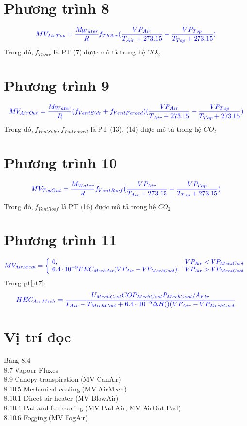 \documentclass[13pt,a4paper]{article}
\begin{document}
	\section{Phương trình 8}
		\begin{align}
			\color{blue}
				MV_{AirTop} = \frac{M_{Water}}{R}f_{ThScr}(\dfrac{VP_{Air}}{T_{Air} + 273.15} - \dfrac{VP_{Top}}{T_{Top} + 273.15})
			\color{blue}
			\label{pt8}
		\end{align}
		Trong đó, $f_{ThScr}$ là PT (7) được mô tả trong hệ $CO_2$
	\section{Phương trình 9}
		\begin{align}
			\color{blue}
				MV_{AirOut} = \frac{M_{Water}}{R}(f_{VentSide} + f_{VentForced})(\dfrac{VP_{Air}}{T_{Air} + 273.15} - \dfrac{VP_{Top}}{T_{Top} + 273.15})
			\color{blue}
			\label{pt9}
		\end{align}
		Trong đó, $f_{VentSide}, f_{VentForced}$ là PT (13), (14) được mô tả trong hệ $CO_2$
	\section{Phương trình 10}
		\begin{align}
			\color{blue}
				MV_{TopOut} = \frac{M_{Water}}{R}f_{VentRoof}(\dfrac{VP_{Air}}{T_{Air} + 273.15} - \dfrac{VP_{Top}}{T_{Top} + 273.15})
			\color{blue}
			\label{pt10}
		\end{align}
		Trong đó, $f_{VentRoof}$ là PT (16) được mô tả trong hệ $CO_2$
	\section{Phương trình 11}
		\begin{align}
			\color{blue}
			MV_{AirMech} = \left\{\begin{array}{llr}
				0,& VP_{Air} < VP_{MechCool} \\
				6.4\cdot 10^{-9} HEC_{MechAir}(VP_{Air} - VP_{MechCool}).& VP_{Air} > VP_{MechCool}
			\end{array}\right.
			\color{blue}
			\label{pt11}
		\end{align}
		Trong pt\ref{pt7}:
		\begin{align*}
			\color{blue}
				HEC_{AirMech} = \dfrac{U_{MechCool}COP_{MechCool}P_{MechCool}/A_{Flr}}{T_{Air} - T_{MechCool} +6.4\cdot 10^{-9}\Delta H ()(VP_{Air} - VP_{MechCool}}
			\color{blue}
		\end{align*}
	\section{Vị trí đọc}
	Bảng 8.4 \\
	8.7 Vapour Fluxes \\
	8.9 Canopy transpiration (MV CanAir)\\
	8.10.5 Mechanical cooling (MV AirMech) \\
	8.10.1 Direct air heater (MV BlowAir) \\
	8.10.4 Pad and fan cooling (MV Pad Air, MV AirOut Pad) \\
	8.10.6 Fogging (MV FogAir) \\
\end{document}
